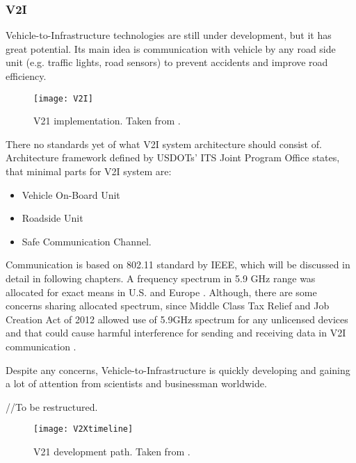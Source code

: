 \subsubsection{V2I}
% 
Vehicle-to-Infrastructure technologies are still under development, but it has great potential. Its main idea is communication with vehicle by any road side unit (e.g. traffic lights, road sensors) to prevent accidents and improve road efficiency.\par
% 
\begin{figure}[h]
\texttt{[image: V2I]}
\caption{V21 implementation. Taken from \cite{U.S.GovernmentAccountabilityOffice2015IntelligentExist}.}
\label{fig:V2Iimplementation}
\centering
\end{figure}
% 
There no standards yet of what V2I system architecture should consist of. Architecture framework defined by USDOTs' ITS Joint Program Office \cite{Dr.Gaspar2014HighlySystems} states, that minimal parts for V2I system are:
\begin{itemize}
    \item Vehicle On-Board Unit
    \item Roadside Unit
    \item Safe Communication Channel.
\end{itemize}
% 
Communication is based on 802.11 standard by IEEE, which will be discussed in detail in following chapters. A frequency spectrum in 5.9 GHz range was allocated for exact means in U.S. and Europe \cite{2011TheTechnology}. Although, there are some concerns sharing allocated spectrum, since Middle Class Tax Relief and Job Creation Act of 2012 allowed use of 5.9GHz spectrum for any unlicensed devices and that could cause harmful interference for sending and receiving data in V2I communication \cite{U.S.GovernmentAccountabilityOffice2015IntelligentExist}.\par
% 
Despite any concerns, Vehicle-to-Infrastructure is quickly developing and gaining a lot of attention from scientists and businessman worldwide.\par
%
//To be restructured.
% 
\begin{figure}[h]
\texttt{[image: V2Xtimeline]}
\caption{V21 development path. Taken from \cite{U.S.GovernmentAccountabilityOffice2015IntelligentExist}.}
\label{fig:V2Idevelopment}
\centering
\end{figure}
